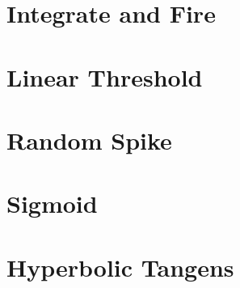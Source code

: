 \documentclass[a4paper, 12pt]{article}
\begin{document}
\section*{Integrate and Fire}


\section*{Linear Threshold}  


\section*{Random Spike}      


\section*{Sigmoid}           


\section*{Hyperbolic Tangens}

\end{document}
